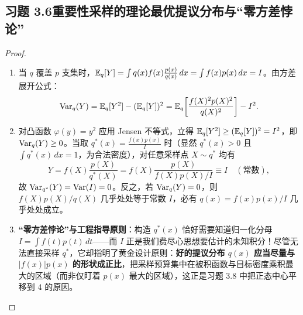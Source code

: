\subsection*{习题 3.6\quad 重要性采样的理论最优提议分布与“零方差悖论”}
\begin{proof}
\begin{enumerate}[label=(\arabic*), leftmargin=1.8em]
  \item 当 $q$ 覆盖 $p$ 支集时，$\mathbb{E}_q[Y] = \int q(x) f(x)\frac{p(x)}{q(x)}\,dx = \int f(x)p(x)\,dx = I$。由方差展开公式：
  \[
    \operatorname{Var}_q(Y) = \mathbb{E}_q[Y^2] - (\mathbb{E}_q[Y])^2 = \mathbb{E}_q\!\left[\frac{f(X)^2 p(X)^2}{q(X)^2}\right] - I^2.
  \]
  \item 对凸函数 $\varphi(y) = y^2$ 应用 Jensen 不等式，立得 $\mathbb{E}_q[Y^2] \ge (\mathbb{E}_q[Y])^2 = I^2$，即 $\operatorname{Var}_q(Y) \ge 0$。当取 $q^*(x) = \frac{f(x)p(x)}{I}$ 时（显然 $q^*(x) > 0$ 且 $\int q^*(x)\,dx = 1$，为合法密度），对任意采样点 $X \sim q^*$ 均有
  \[
    Y = f(X)\frac{p(X)}{q^*(X)} = f(X)\frac{p(X)}{f(X)p(X)/I} \equiv I\quad (\text{常数}),
  \]
  故 $\operatorname{Var}_{q^*}(Y) = \operatorname{Var}(I) = 0$。反之，若 $\operatorname{Var}_q(Y) = 0$，则 $f(X)p(X)/q(X)$ 几乎处处等于常数 $I$，必有 $q(x) = f(x)p(x)/I$ 几乎处处成立。
  \item \textbf{“零方差悖论”与工程指导原则}：构造 $q^*(x)$ 恰好需要知道归一化分母 $I = \int f(t)p(t)\,dt$——而 $I$ 正是我们费尽心思想要估计的未知积分！尽管无法直接采样 $q^*$，它却指明了黄金设计原则：\textbf{好的提议分布 $q(x)$ 应当尽量与 $|f(x)|p(x)$ 的形状成正比}，把采样预算集中在被积函数与目标密度乘积最大的区域（而非仅盯着 $p(x)$ 最大的区域），这正是习题 3.8 中把正态中心平移到 $4$ 的原因。
\end{enumerate}
\end{proof}

